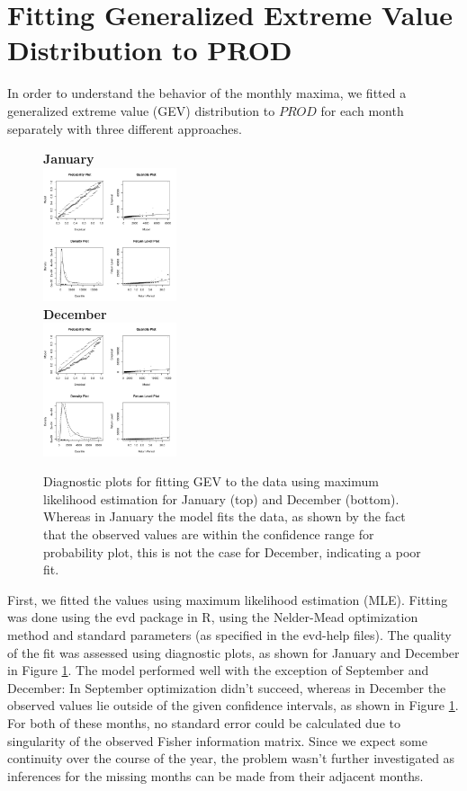 \documentclass[10pt,conference,compsocconf]{IEEEtran}
\begin{document}
\section*{Fitting Generalized Extreme Value Distribution to PROD}
In order to understand the behavior of the monthly maxima, we fitted a generalized extreme value (GEV) distribution to $PROD$ for each month separately with three different approaches. 
\begin{figure}
	\centering
	\textbf{January}\\
	\includegraphics[width=0.35\textwidth]{../plots/monthly_mle_diag/01_monthly_mle_diag.pdf}\\
	\textbf{December}\\
	\includegraphics[width=0.35\textwidth]{../plots/monthly_mle_diag/12_monthly_mle_diag.pdf}
	\caption{Diagnostic plots for fitting GEV to the data using maximum likelihood estimation for January (top) and December (bottom). Whereas in January the model fits the data, as shown by the fact that the observed values are within the confidence range for probability plot, this is not the case for December, indicating a poor fit.}
	\label{fig:mle_diag}
\end{figure}
\par
First, we fitted the values using maximum likelihood estimation (MLE). Fitting was done using the evd package in R, using the Nelder-Mead optimization method and standard parameters (as specified in the evd-help files). The quality of the fit was assessed using diagnostic plots, as shown for January and December in Figure \ref{fig:mle_diag}. The model performed well with the exception of September and December: In September optimization didn't succeed, whereas in December the observed values lie outside of the given confidence intervals, as shown in Figure \ref{fig:mle_diag}. For both of these months, no standard error could be calculated due to singularity of the observed Fisher information matrix. Since we expect some continuity over the course of the year, the problem wasn't further investigated as inferences for the missing months can be made from their adjacent months. 
\end{document}
